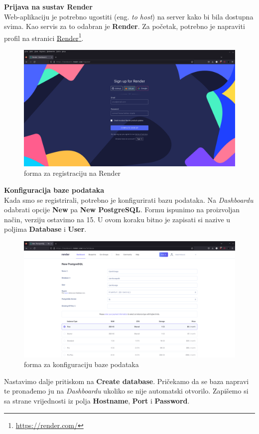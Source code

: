 			 \textbf{Prijava na sustav Render}\\
			 
			 
			 Web-aplikaciju je potrebno ugostiti (eng. \textit{to host}) na server kako bi bila dostupna svima. Kao servis za to odabran je \textbf{Render}. Za početak, potrebno je napraviti profil na stranici \underline{Render}\footnote{\url{https://render.com/}}.
			 \begin{figure}[H]
			\includegraphics[width=\textwidth]{slike/signup.png} %
			\caption{forma za registraciju na Render}
			\label{fig:signup} %
			\end{figure}
			 
			 
			 \textbf{Konfiguracija baze podataka}\\
			 
			 
			Kada smo se registrirali, potrebno je konfigurirati bazu podataka. Na \textit{Dashboardu} odabrati opcije \textbf{New} pa \textbf{New PostgreSQL}. Formu ispunimo na proizvoljan način, verziju ostavimo na 15. U ovom koraku bitno je zapisati si nazive u poljima \textbf{Database} i \textbf{User}. 
			\begin{figure}[H]
			\includegraphics[width=\textwidth]{slike/konfigdb.png} %
			\caption{forma za konfiguraciju baze podataka}
			\label{fig:konfigdb} %
			\end{figure}
			Nastavimo dalje pritiskom na \textbf{Create database}.
			Pričekamo da se baza napravi te pronađemo ju na \textit{Dashboardu} ukoliko se nije automatski otvorilo. Zapišemo si sa strane vrijednosti iz polja \textbf{Hostname}, \textbf{Port} i \textbf{Password}.\\
			
